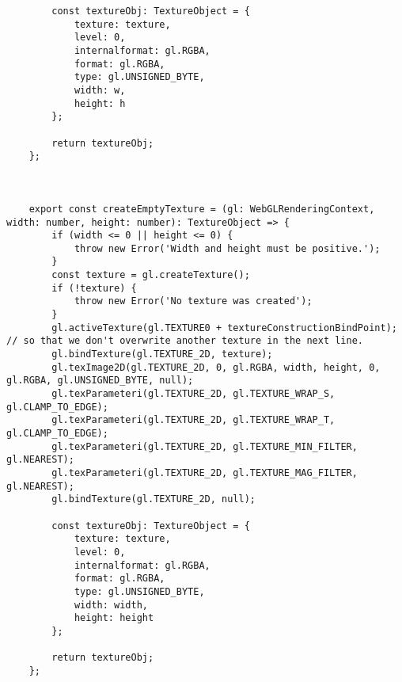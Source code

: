 {\begin{lstlisting}
        const textureObj: TextureObject = {
            texture: texture,
            level: 0,
            internalformat: gl.RGBA,
            format: gl.RGBA,
            type: gl.UNSIGNED_BYTE,
            width: w,
            height: h
        };
    
        return textureObj;
    };
    
    
    
    export const createEmptyTexture = (gl: WebGLRenderingContext, width: number, height: number): TextureObject => {
        if (width <= 0 || height <= 0) {
            throw new Error('Width and height must be positive.');
        }
        const texture = gl.createTexture();
        if (!texture) {
            throw new Error('No texture was created');
        }
        gl.activeTexture(gl.TEXTURE0 + textureConstructionBindPoint); // so that we don't overwrite another texture in the next line.
        gl.bindTexture(gl.TEXTURE_2D, texture);
        gl.texImage2D(gl.TEXTURE_2D, 0, gl.RGBA, width, height, 0, gl.RGBA, gl.UNSIGNED_BYTE, null);
        gl.texParameteri(gl.TEXTURE_2D, gl.TEXTURE_WRAP_S, gl.CLAMP_TO_EDGE);
        gl.texParameteri(gl.TEXTURE_2D, gl.TEXTURE_WRAP_T, gl.CLAMP_TO_EDGE);
        gl.texParameteri(gl.TEXTURE_2D, gl.TEXTURE_MIN_FILTER, gl.NEAREST);
        gl.texParameteri(gl.TEXTURE_2D, gl.TEXTURE_MAG_FILTER, gl.NEAREST);
        gl.bindTexture(gl.TEXTURE_2D, null);
    
        const textureObj: TextureObject = {
            texture: texture,
            level: 0,
            internalformat: gl.RGBA,
            format: gl.RGBA,
            type: gl.UNSIGNED_BYTE,
            width: width,
            height: height
        };
    
        return textureObj;
    };
    

\end{lstlisting}}
